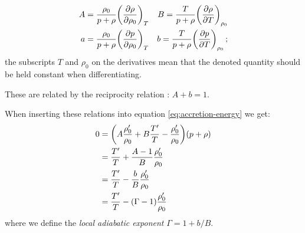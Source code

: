 \documentclass[main.tex]{subfiles}
\begin{document}
\begin{subequations}
\begin{align}
  A &= \frac{\rho_0}{p + \rho} \qty(\pdv{\rho}{\rho_0})_T
  &B = \frac{T}{p + \rho} \qty(\pdv{\rho}{T})_{\rho_0} \\
  a &= \frac{\rho_0}{p + \rho} \qty(\pdv{p}{\rho_0})_T
  &b = \frac{T}{p + \rho} \qty(\pdv{p}{T})_{\rho_0} \,;
\end{align}
\end{subequations}
the subscripts \(T\) and \(\rho_0\) on the derivatives mean that the denoted quantity should be held constant when differentiating.

These are related by the reciprocity relation \cite[eq. B3]{Flammang:1982}: \(A + b = 1\).

When inserting these relations into equation \eqref{eq:accretion-energy} we get:
%
\begin{subequations}
\begin{align}
  0 &=\qty( A \frac{\rho_0 '}{\rho_0} + B \frac{T ^{\prime}}{T} - \frac{\rho_0 ^{\prime}}{\rho_0}) (p+ \rho) \\
  &= \frac{T ^{\prime}}{T} + \frac{A-1}{B} \frac{\rho_0 ^{\prime}}{\rho_0 }  \\
  &= \frac{T ^{\prime}}{T} - \frac{b}{B} \frac{\rho_0 ^{\prime}}{\rho_0} \\
  &= \frac{T ^{\prime}}{T} - (\Gamma - 1) \frac{\rho_0  ^{\prime}}{\rho_0  } \label{eq:simplified-energy}
\end{align}
\end{subequations}
%
where we define the \emph{local adiabatic exponent} \(\Gamma = 1+b/B\).
\end{document}
